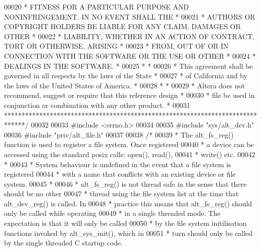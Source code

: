 \begin{DoxyCode}
00020 \textcolor{comment}{* FITNESS FOR A PARTICULAR PURPOSE AND NONINFRINGEMENT. IN NO EVENT SHALL THE *}
00021 \textcolor{comment}{* AUTHORS OR COPYRIGHT HOLDERS BE LIABLE FOR ANY CLAIM, DAMAGES OR OTHER      *}
00022 \textcolor{comment}{* LIABILITY, WHETHER IN AN ACTION OF CONTRACT, TORT OR OTHERWISE, ARISING     *}
00023 \textcolor{comment}{* FROM, OUT OF OR IN CONNECTION WITH THE SOFTWARE OR THE USE OR OTHER         *}
00024 \textcolor{comment}{* DEALINGS IN THE SOFTWARE.                                                   *}
00025 \textcolor{comment}{*                                                                             *}
00026 \textcolor{comment}{* This agreement shall be governed in all respects by the laws of the State   *}
00027 \textcolor{comment}{* of California and by the laws of the United States of America.              *}
00028 \textcolor{comment}{*                                                                             *}
00029 \textcolor{comment}{* Altera does not recommend, suggest or require that this reference design    *}
00030 \textcolor{comment}{* file be used in conjunction or combination with any other product.          *}
00031 \textcolor{comment}{******************************************************************************/}
00032 
00033 \textcolor{preprocessor}{#include <errno.h>}
00034 
00035 \textcolor{preprocessor}{#include "sys/alt_dev.h"}
00036 \textcolor{preprocessor}{#include "priv/alt_file.h"}
00037 
00038 \textcolor{comment}{/*}
00039 \textcolor{comment}{ * The alt\_fs\_reg() function is used to register a file system. Once registered }
00040 \textcolor{comment}{ * a device can be accessed using the standard posix calls: open(), read(), }
00041 \textcolor{comment}{ * write() etc.}
00042 \textcolor{comment}{ *}
00043 \textcolor{comment}{ * System behaviour is undefined in the event that a file system is registered }
00044 \textcolor{comment}{ * with a name that conflicts with an existing device or file system.}
00045 \textcolor{comment}{ *}
00046 \textcolor{comment}{ * alt\_fs\_reg() is not thread safe in the sense that there should be no other }
00047 \textcolor{comment}{ * thread using the file system list at the time that alt\_dev\_reg() is called. In}
00048 \textcolor{comment}{ * practice this means that alt\_fs\_reg() should only be called while operating}
00049 \textcolor{comment}{ * in a single threaded mode. The expectation is that it will only be called}
00050 \textcolor{comment}{ * by the file system initilisation functions invoked by alt\_sys\_init(), which in }
00051 \textcolor{comment}{ * turn should only be called by the single threaded C startup code.   }

\end{DoxyCode}
